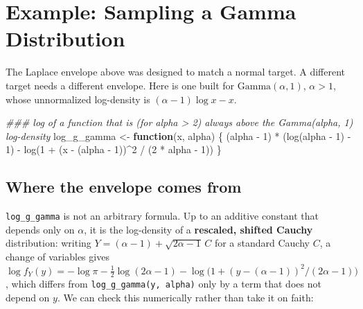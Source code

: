 \documentclass[
  letterpaper,
  DIV=11,
  numbers=noendperiod]{scrreprt}
\newenvironment{Shaded}{\begin{snugshade}}{\end{snugshade}}
\newcommand{\ControlFlowTok}[1]{\textcolor[rgb]{0.00,0.23,0.31}{\textbf{#1}}}
\newcommand{\DecValTok}[1]{\textcolor[rgb]{0.68,0.00,0.00}{#1}}
\newcommand{\DocumentationTok}[1]{\textcolor[rgb]{0.37,0.37,0.37}{\textit{#1}}}
\newcommand{\FunctionTok}[1]{\textcolor[rgb]{0.28,0.35,0.67}{#1}}
\newcommand{\NormalTok}[1]{\textcolor[rgb]{0.00,0.23,0.31}{#1}}
\newcommand{\OtherTok}[1]{\textcolor[rgb]{0.00,0.23,0.31}{#1}}
\newcommand{\SpecialCharTok}[1]{\textcolor[rgb]{0.37,0.37,0.37}{#1}}
\begin{document}
\section{Example: Sampling a Gamma
Distribution}\label{example-sampling-a-gamma-distribution}

The Laplace envelope above was designed to match a normal target. A
different target needs a different envelope. Here is one built for
\(\text{Gamma}(\alpha, 1)\), \(\alpha > 1\), whose unnormalized
log-density is \((\alpha-1)\log x - x\).

\begin{Shaded}
\begin{Highlighting}[]
\DocumentationTok{\#\#\# log of a function that is (for alpha \textgreater{} 2) always above the Gamma(alpha, 1) log{-}density}
\NormalTok{log\_g\_gamma }\OtherTok{\textless{}{-}} \ControlFlowTok{function}\NormalTok{(x, alpha) \{}
\NormalTok{    (alpha }\SpecialCharTok{{-}} \DecValTok{1}\NormalTok{) }\SpecialCharTok{*}\NormalTok{ (}\FunctionTok{log}\NormalTok{(alpha }\SpecialCharTok{{-}} \DecValTok{1}\NormalTok{) }\SpecialCharTok{{-}} \DecValTok{1}\NormalTok{) }\SpecialCharTok{{-}} \FunctionTok{log}\NormalTok{(}\DecValTok{1} \SpecialCharTok{+}\NormalTok{ (x }\SpecialCharTok{{-}}\NormalTok{ (alpha }\SpecialCharTok{{-}} \DecValTok{1}\NormalTok{))}\SpecialCharTok{\^{}}\DecValTok{2} \SpecialCharTok{/}\NormalTok{ (}\DecValTok{2} \SpecialCharTok{*}\NormalTok{ alpha }\SpecialCharTok{{-}} \DecValTok{1}\NormalTok{))}
\NormalTok{\}}
\end{Highlighting}
\end{Shaded}

\subsection{Where the envelope comes
from}\label{where-the-envelope-comes-from}

\texttt{log\_g\_gamma} is not an arbitrary formula. Up to an additive
constant that depends only on \(\alpha\), it is the log-density of a
\textbf{rescaled, shifted Cauchy} distribution: writing
\(Y = (\alpha-1) + \sqrt{2\alpha-1}\,C\) for a standard Cauchy \(C\), a
change of variables gives
\(\log f_Y(y) = -\log\pi - \tfrac12\log(2\alpha-1) - \log\!\big(1 + (y-(\alpha-1))^2/(2\alpha-1)\big)\),
which differs from \texttt{log\_g\_gamma(y,\ alpha)} only by a term that
does not depend on \(y\). We can check this numerically rather than take
it on faith:
\end{document}
